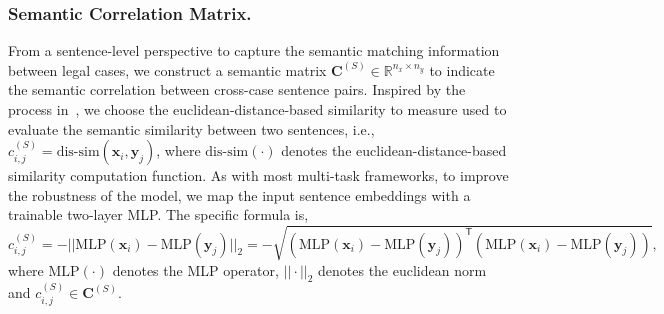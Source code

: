 \subsubsection{Semantic Correlation Matrix.} \label{subsubsec: semantic correlation matrix}
From a sentence-level perspective to capture the semantic matching information between legal cases, we construct a semantic matrix $\mathbf{C}^{(S)} \in \mathbb{R}^{n_x \times n_y}$ to indicate the semantic correlation between cross-case sentence pairs.
Inspired by the process in~\cite{yu2022Explainable}, we choose the euclidean-distance-based similarity to measure used to evaluate the semantic similarity between two sentences, i.e., $c_{i, j}^{(S)} = \text{dis-sim}(\mathbf{x}_i, \mathbf{y}_j)$, where $\text{dis-sim}(\cdot)$ denotes the euclidean-distance-based similarity computation function.
As with most multi-task frameworks, to improve the robustness of the model, we map the input sentence embeddings with a trainable two-layer MLP.
The specific formula is,
\begin{equation} \label{eq: semantic correlation matrix}
    c^{(S)}_{i,j} = -||\text{MLP}(\mathbf{x}_i) - \text{MLP}(\mathbf{y}_j)||_{2}=
    -\sqrt{(\text{MLP}(\mathbf{x}_i) - \text{MLP}(\mathbf{y}_j))^\mathsf{T}(\text{MLP}(\mathbf{x}_i) - \text{MLP}(\mathbf{y}_j))},
\end{equation}
where $\text{MLP}(\cdot)$ denotes the MLP operator, $||\cdot||_{2}$ denotes the euclidean norm and $c^{(S)}_{i,j} \in \mathbf{C}^{(S)}$.
